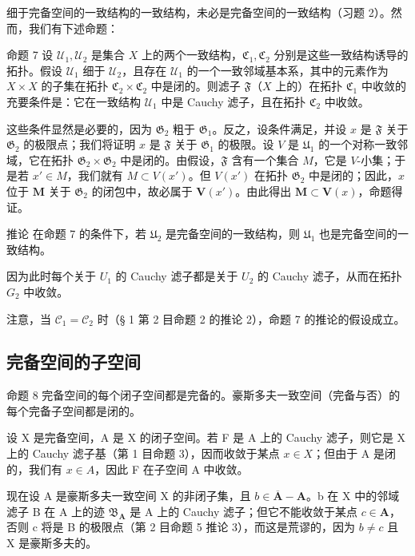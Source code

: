 细于完备空间的一致结构的一致结构，未必是完备空间的一致结构（习题 2）。然而，我们有下述命题：

命题 7 设 \(\mathcal{U}_1, \mathcal{U}_2\) 是集合 \(X\) 上的两个一致结构，\(\mathfrak{C}_1, \mathfrak{C}_2\) 分别是这些一致结构诱导的拓扑。假设 \(\mathcal{U}_1\) 细于 \(\mathcal{U}_2\)，且存在 \(\mathcal{U}_1\) 的一个一致邻域基本系，其中的元素作为 \(X \times X\) 的子集在拓扑 \(\mathfrak{C}_2 \times \mathfrak{C}_2\) 中是闭的。则滤子 \(\mathfrak{F}\)（\(X\) 上的）在拓扑 \(\mathfrak{C}_1\) 中收敛的充要条件是：它在一致结构 \(\mathcal{U}_1\) 中是 Cauchy 滤子，且在拓扑 \(\mathfrak{C}_2\) 中收敛。

这些条件显然是必要的，因为 \(\mathfrak{G}_2\) 粗于 \(\mathfrak{G}_1\)。反之，设条件满足，并设 \(x\) 是 \(\mathfrak{F}\) 关于 \(\mathfrak{G}_2\) 的极限点；我们将证明 \(x\) 是 \(\mathfrak{F}\) 关于 \(\mathfrak{G}_1\) 的极限。设 \(V\) 是 \(\mathfrak{U}_1\) 的一个对称一致邻域，它在拓扑 \(\mathfrak{G}_2 \times \mathfrak{G}_2\) 中是闭的。由假设，\(\mathfrak{F}\) 含有一个集合 \(M\)，它是 \(V\)-小集；于是若 \(x' \in M\)，我们就有 \(M \subset V(x')\)。但 \(V(x')\) 在拓扑 \(\mathfrak{G}_{2}\) 中是闭的；因此，\(x\) 位于 \(\mathbf{M}\) 关于 \(\mathfrak{G}_{2}\) 的闭包中，故必属于 \(\mathbf{V}(x')\)。由此得出 \(\mathbf{M} \subset \mathbf{V}(x)\)，命题得证。

推论 在命题 7 的条件下，若 \(\mathfrak{U}_2\) 是完备空间的一致结构，则 \(\mathfrak{U}_1\) 也是完备空间的一致结构。

因为此时每个关于 \(U_{1}\) 的 Cauchy 滤子都是关于 \(U_{2}\) 的 Cauchy 滤子，从而在拓扑 \(G_{2}\) 中收敛。

注意，当 \(\mathcal{C}_1 = \mathcal{C}_2\) 时（§ 1 第 2 目命题 2 的推论 2），命题 7 的推论的假设成立。

\subsection{完备空间的子空间}

命题 8 完备空间的每个闭子空间都是完备的。豪斯多夫一致空间（完备与否）的每个完备子空间都是闭的。

设 X 是完备空间，A 是 X 的闭子空间。若 F 是 A 上的 Cauchy 滤子，则它是 X 上的 Cauchy 滤子基（第 1 目命题 3），因而收敛于某点 \(x \in X\)；但由于 A 是闭的，我们有 \(x \in A\)，因此 F 在子空间 A 中收敛。

现在设 A 是豪斯多夫一致空间 X 的非闭子集，且 \(b \in \overline{\mathbf{A}} - \mathbf{A}\)。b 在 X 中的邻域滤子 B 在 A 上的迹 \(\mathfrak{B}_{\mathbf{A}}\) 是 A 上的 Cauchy 滤子；但它不能收敛于某点 \(c \in \mathbf{A}\)，否则 c 将是 B 的极限点（第 2 目命题 5 推论 3），而这是荒谬的，因为 \(b \neq c\) 且 X 是豪斯多夫的。

